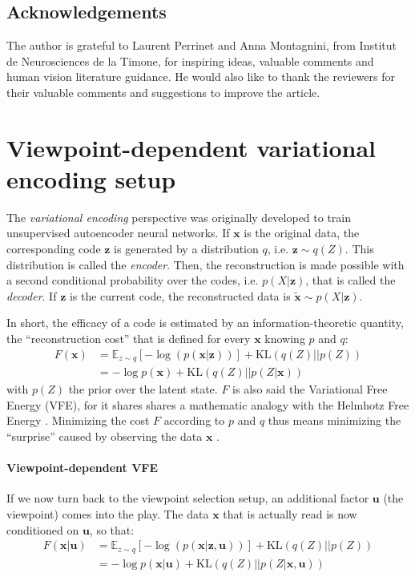 \documentclass[12pt,twoside,openright]{article}
\begin{document}
\subsection*{Acknowledgements}
The author is grateful to Laurent Perrinet and Anna Montagnini, from Institut de Neurosciences de la Timone, for inspiring ideas, valuable comments and human vision literature guidance.  He would also like to thank the reviewers for their valuable comments and suggestions to improve the article.

\appendix

\section{Viewpoint-dependent variational encoding setup}\label{app:VFE}
{\color{Purple} 
	The \emph{variational encoding} perspective \citep{hinton1994autoencoders} was originally developed 
	to train unsupervised autoencoder neural networks. 
	If $\boldsymbol{x}$ is the original data, the corresponding code $\boldsymbol{z}$ is generated by a distribution $q$, i.e. $\boldsymbol{z} \sim q(Z)$. This distribution is called the \emph{encoder}. Then, the reconstruction is made possible with a second conditional probability over the codes, i.e. $p(X|\boldsymbol{z})$, that is called the \emph{decoder}. If $\boldsymbol{z}$ is the current code, the reconstructed data is $\tilde{\boldsymbol{x}} \sim p(X|\boldsymbol{z})$. 
	
	In short, the efficacy of a code is estimated by an information-theoretic quantity, the ``reconstruction cost'' that is defined for every $\boldsymbol{x}$ knowing $p$ and $q$:
	\begin{align}
	F(\boldsymbol{x}) 
	&= \mathbb{E}_{z\sim q} \left[-\log (p(\boldsymbol{x}|\boldsymbol{z}))\right] +\text{KL}(q(Z)||p(Z))
	\label{eq:FEP-prior}\\
	&= - \log p(\boldsymbol{x}) + \text{KL}(q(Z)||p(Z|\boldsymbol{x}))
	\label{eq:FEP}
	\end{align}
	with $p(Z)$ the prior over the latent state.
	$F$ is also said the Variational Free Energy (VFE), for it shares shares a mathematic analogy with the Helmhotz Free Energy \citep{friston2010free}.
	Minimizing the cost $F$ according to $p$ and $q$ thus means minimizing the ``surprise'' caused by observing the data $\boldsymbol{x}$ \citep{friston2010free}.
	
	\paragraph{Viewpoint-dependent VFE}
	If we now turn back to the viewpoint selection setup, an additional factor $\boldsymbol{u}$ (the viewpoint) comes into the play. The data $\boldsymbol{x}$ that is actually read is now conditioned on  $\boldsymbol{u}$, so that:
	\begin{align}
	F(\boldsymbol{x}|\boldsymbol{u}) 
	&= \mathbb{E}_{z\sim q} \left[-\log (p(\boldsymbol{x}|\boldsymbol{z},\boldsymbol{u}))\right] +\text{KL}(q(Z)||p(Z))
	\label{eq:FEP-prior-u-app}\\
	&= - \log p(\boldsymbol{x}|\boldsymbol{u}) + \text{KL}(q(Z)||p(Z|\boldsymbol{x}, \boldsymbol{u}))
	\label{eq:FEP-posterior-u-app}\end{align}
}
\end{document}
